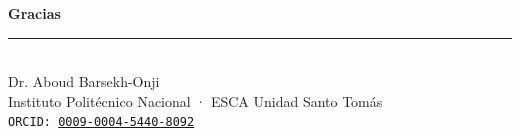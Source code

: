 \documentclass[aspectratio=169,xcolor=dvipsnames]{beamer}
\begin{document}
\begin{frame}
    \begin{center}
        {\Large \textcolor{IPNguinda}{\textbf{Gracias}}}\\[6pt]
        {\color{IPNdorado}\rule{0.4\linewidth}{1.2pt}}\\[6pt]
        Dr. Aboud Barsekh-Onji \\
        \small Instituto Politécnico Nacional · ESCA Unidad Santo Tomás \\
        \small \texttt{ORCID: \href{https://orcid.org/0009-0004-5440-8092}{0009-0004-5440-8092}}
    \end{center}
\end{frame}
\end{document}

